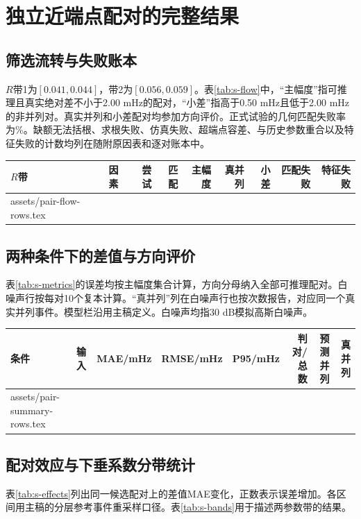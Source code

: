 \documentclass[UTF8,a4paper,11pt]{ctexart}
\makeatletter
\newcommand{\resultrows}[1]{\@@input #1 }
\makeatother
\begin{document}
\clearpage
\section{独立近端点配对的完整结果}
\subsection{筛选流转与失败账本}
$R$带1为$[0.041,0.044]$，带2为$[0.056,0.059]$。表\ref{tab:s-flow}中，“主幅度”指可推理且真实绝对差不小于2.00 mHz的配对，“小差”指高于0.50 mHz且低于2.00 mHz的非并列对。真实并列和小差配对均参加方向评价。正式试验的几何匹配失败率为\PairMatchFailureRate{}\%。缺额无法括根、求根失败、仿真失败、超端点容差、与历史参数重合以及特征失败的计数均列在随附原因表和逐对账本中。

\begin{center}
\small
{}
\label{tab:s-flow}
\begin{tabular}{llrrrrrrr}
\toprule
$R$带 & 因素 & 尝试 & 匹配 & 主幅度 & 真并列 & 小差 & 匹配失败 & 特征失败\\
\midrule
\resultrows{assets/pair-flow-rows.tex}
\bottomrule
\end{tabular}
\end{center}

\subsection{两种条件下的差值与方向评价}
表\ref{tab:s-metrics}的误差均按主幅度集合计算，方向分母纳入全部可推理配对。白噪声行按每对10个复本计算。“真并列”列在白噪声行也按次数报告，对应同一个真实并列事件。模型栏沿用主稿定义。白噪声均指30 dB模拟高斯白噪声。

\begin{center}
\small
{}
\label{tab:s-metrics}
\setlength{\tabcolsep}{4pt}
\begin{tabular}{llrrrrrr}
\toprule
条件 & 输入 & MAE/mHz & RMSE/mHz & P95/mHz & 判对/总数 & 预测并列 & 真并列\\
\midrule
\resultrows{assets/pair-summary-rows.tex}
\bottomrule
\end{tabular}
\end{center}

\clearpage
\subsection{配对效应与下垂系数分带统计}
表\ref{tab:s-effects}列出同一候选配对上的差值MAE变化，正数表示误差增加。各区间用主稿的分层参考事件重采样口径。表\ref{tab:s-bands}用于描述两参数带的结果。
\end{document}
